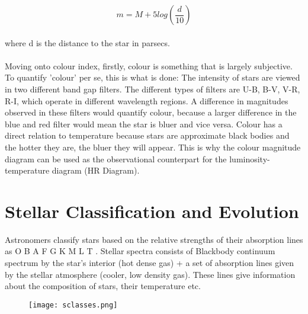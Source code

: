 \documentclass{article}
\begin{document}
$$m = M+5log(\frac{d}{10})$$ \\where d is the distance to the star in parsecs.\\
\\
Moving onto colour index, firstly, colour is something that is largely subjective. To quantify 'colour' per se, this is what is done: The intensity of stars are viewed in two different band gap filters. The different types of filters are U-B, B-V, V-R, R-I, which operate in different wavelength regions. A difference in magnitudes observed in these filters would quantify colour, because a larger difference in the blue and red filter would mean the star is bluer and vice versa. Colour has a direct relation to temperature because stars are approximate black bodies and the hotter they are, the bluer they will appear. This is why the colour magnitude diagram can be used as the observational counterpart for the luminosity-temperature diagram (HR Diagram).
\\
\section{Stellar Classification and Evolution}
Astronomers classify stars based on the relative strengths of their absorption lines as  O B A F G K M L T .\newline
Stellar spectra consists of Blackbody continuum spectrum by the star’s interior (hot dense gas) + a set of absorption lines given by the stellar atmosphere (cooler, low density gas).
These lines give information about the composition of stars, their temperature etc.\\
\begin{figure}[H]
\caption{}
\centering
\texttt{[image: sclasses.png]}\newline
\end{figure}
\end{document}
